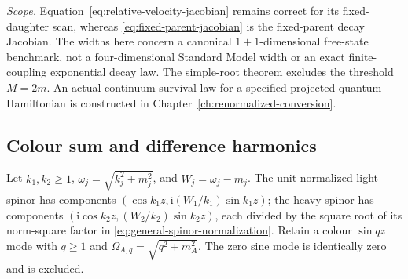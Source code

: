 \documentclass[11pt,a4paper,oneside]{book}
\theoremstyle{plain}
\theoremstyle{definition}
\theoremstyle{remark}
\newcommand{\ii}{\mathrm i}
\newcommand{\scope}[1]{\par\smallskip\noindent\textit{Scope.} #1\par\smallskip}
\begin{document}
\scope{Equation~\eqref{eq:relative-velocity-jacobian} remains correct for
its fixed-daughter scan, whereas \eqref{eq:fixed-parent-jacobian} is
the fixed-parent decay Jacobian.  The widths here concern a canonical
$1+1$-dimensional free-state benchmark, not a four-dimensional Standard
Model width or an exact finite-coupling exponential decay law.  The
simple-root theorem excludes the threshold $M=2m$.  An actual continuum
survival law for a specified projected quantum Hamiltonian is
constructed in Chapter~\ref{ch:renormalized-conversion}.}


\subsection{Colour sum and difference harmonics}
Let $k_1,k_2\ge1$,
$\omega_j=\sqrt{k_j^2+m_j^2}$, and $W_j=\omega_j-m_j$.
The unit-normalized light spinor has components
$(\cos k_1z,\ii(W_1/k_1)\sin k_1z)$; the heavy spinor has components
$(\ii\cos k_2z,(W_2/k_2)\sin k_2z)$, each divided by the square root of its norm-square
factor in \eqref{eq:general-spinor-normalization}.  Retain a colour
$\sin qz$ mode with $q\ge1$ and
$\Omega_{A,q}=\sqrt{q^2+m_A^2}$.  The zero sine mode is identically zero
and is excluded.
\end{document}
